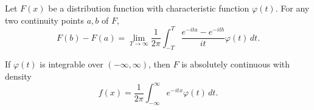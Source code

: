 Let $F(x)$ be a distribution function with characteristic function $\varphi(t)$. For any two continuity points $a, b$ of $F$,
$$F(b) - F(a) = \lim_{T \to \infty} \frac{1}{2\pi} \int_{-T}^{T} \frac{e^{-ita} - e^{-itb}}{it} \varphi(t) \, dt.$$

If $\varphi(t)$ is integrable over $(-\infty, \infty)$, then $F$ is absolutely continuous with density
$$f(x) = \frac{1}{2\pi} \int_{-\infty}^{\infty} e^{-itx} \varphi(t) \, dt.$$
